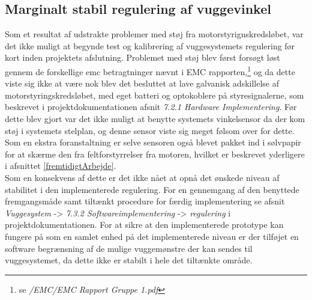 \subsection{Marginalt stabil regulering af vuggevinkel}
Som et resultat af udstrakte problemer med støj fra motorstyrignskredsløbet, var det ikke muligt at begynde test og kalibrering af vuggesystemets regulering før kort inden projektets afslutning. Problemet med støj blev først forsøgt løst gennem de forskellige emc betragtninger nævnt i EMC rapporten,\footnote{se \citep{cd} \textit{/EMC/EMC Rapport Gruppe 1.pdf}} og da dette viste sig ikke at være nok blev det besluttet at lave galvanisk adskillelse af motorstyringskredsløbet, med eget batteri og optokoblere på styresignalerne, som beskrevet i projektdokumentationen afsnit \textit{7.2.1 Hardware Implementering}. Før dette blev gjort var det ikke muligt at benytte systemets vinkelsensor da der kom støj i systemets stelplan, og denne sensor viste sig meget følsom over for dette. Som en ekstra foranstaltning er selve sensoren også blevet pakket ind i sølvpapir for at skærme den fra feltforstyrrelser fra motoren, hvilket er beskrevet yderligere i afsnittet \vref{fremtidigtArbejde}.\\
Som en konsekvens af dette er det ikke nået at opnå det ønskede niveau af stabilitet i den implementerede regulering. For en gennemgang af den benyttede fremgangsmåde samt tiltænkt procedure for færdig implementering se afsnit \textit{Vuggesystem} -> \textit{7.3.2 Softwareimplementering} -> \textit{regulering} i projektdokumentationen. For at sikre at den implementerede prototype kan fungere på som en samlet enhed på det implementerede niveau er der tilføjet en software begrænsning af de mulige vuggemønstre der kan sendes til vuggesystemet, da dette ikke er stabilt i hele det tiltænkte område.